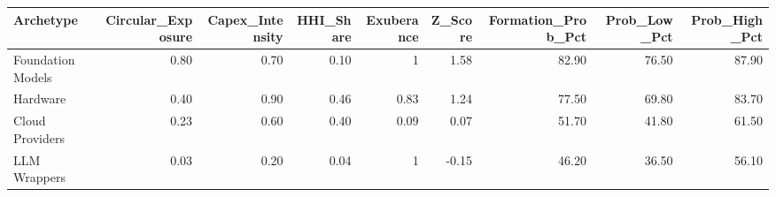 

\begin{tabular}{@{}lrrrrrrrr@{}}
\toprule
Archetype & Circular\_Exposure & Capex\_Intensity & HHI\_Share & Exuberance & Z\_Score & Formation\_Prob\_Pct & Prob\_Low\_Pct & Prob\_High\_Pct \\
\midrule
Foundation Models & 0.80 & 0.70 & 0.10 & 1 & 1.58 & 82.90 & 76.50 & 87.90 \\
Hardware & 0.40 & 0.90 & 0.46 & 0.83 & 1.24 & 77.50 & 69.80 & 83.70 \\
Cloud Providers & 0.23 & 0.60 & 0.40 & 0.09 & 0.07 & 51.70 & 41.80 & 61.50 \\
LLM Wrappers & 0.03 & 0.20 & 0.04 & 1 & -0.15 & 46.20 & 36.50 & 56.10 \\
\bottomrule
\end{tabular}